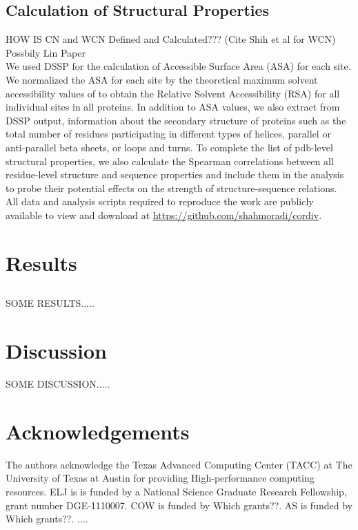 \documentclass[12pt]{article}
\begin{document}
    \subsection*{Calculation of Structural Properties}
    
    HOW IS CN and WCN Defined and Calculated??? (Cite Shih et al for WCN) Possbily Lin Paper \\
\indent We used DSSP \citep{Kabschetal2005}  for the calculation of Accessible Surface Area (ASA) for each site. We normalized the ASA for each site by the theoretical maximum solvent accessibility values of \cite{Tienetal2013}  to obtain the Relative Solvent Accessibility (RSA) for all individual sites in all proteins. In addition to ASA values, we also extract from DSSP output, information about the secondary structure of proteins such as the total number of residues participating in different types of helices, parallel or anti-parallel beta sheets, or loops and turns. To complete the list of pdb-level structural properties, we also calculate the Spearman correlations between all residue-level structure and sequence properties and include them in the analysis to probe their potential effects on the strength of structure-sequence relations. \\

All data and analysis scripts required to reproduce the work are publicly available to view and download at \url{https://github.com/shahmoradi/cordiv}.


\section{Results}
\label{sec:results}

    \subsection*{}
{\color{red}SOME RESULTS.....} \\


\section{Discussion}
\label{sec:dcr}
{\color{red}SOME DISCUSSION.....} \\


\section{Acknowledgements}
The authors acknowledge the Texas Advanced Computing Center (TACC) at The University of Texas at Austin for providing High-performance computing resources. ELJ is is funded by a National Science Graduate Research Fellowship, grant number DGE-1110007. COW is funded by {\color{red} Which grants??}.  AS is funded by {\color{red} Which grants??}.
....
\end{document}
